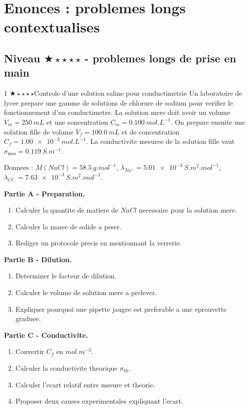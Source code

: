 \documentclass[11pt,a4paper]{article}
\newcommand{\diffone}{\(\bigstar\star\star\star\star\)}
\begin{document}
\newpage


\section{Enonces : problemes longs contextualises}

\subsection{Niveau \diffone{} - problemes longs de prise en main}

\begin{probleme}{1 \diffone}{Controle d'une solution saline pour conductimetrie}
Un laboratoire de lycee prepare une gamme de solutions de chlorure de sodium pour verifier le fonctionnement d'un conductimetre. La solution mere doit avoir un volume \(V_m=\SI{250}{mL}\) et une concentration \(C_m=\SI{0.100}{mol.L^{-1}}\). On prepare ensuite une solution fille de volume \(V_f=\SI{100.0}{mL}\) et de concentration \(C_f=\SI{1.00e-2}{mol.L^{-1}}\). La conductivite mesuree de la solution fille vaut \(\sigma_{\text{mes}}=\SI{0.119}{S.m^{-1}}\).

Donnees : \(M(NaCl)=\SI{58.5}{g.mol^{-1}}\), \(\lambda_{Na^+}=\SI{5.01e-3}{S.m^2.mol^{-1}}\), \(\lambda_{Cl^-}=\SI{7.63e-3}{S.m^2.mol^{-1}}\).

\textbf{Partie A - Preparation.}
\begin{enumerate}
\item Calculer la quantite de matiere de \(NaCl\) necessaire pour la solution mere.
\item Calculer la masse de solide a peser.
\item Rediger un protocole precis en mentionnant la verrerie.
\end{enumerate}

\textbf{Partie B - Dilution.}
\begin{enumerate}[resume]
\item Determiner le facteur de dilution.
\item Calculer le volume de solution mere a prelever.
\item Expliquer pourquoi une pipette jaugee est preferable a une eprouvette graduee.
\end{enumerate}

\textbf{Partie C - Conductivite.}
\begin{enumerate}[resume]
\item Convertir \(C_f\) en \(\si{mol.m^{-3}}\).
\item Calculer la conductivite theorique \(\sigma_{\text{th}}\).
\item Calculer l'ecart relatif entre mesure et theorie.
\item Proposer deux causes experimentales expliquant l'ecart.
\end{enumerate}
\end{probleme}
\end{document}
